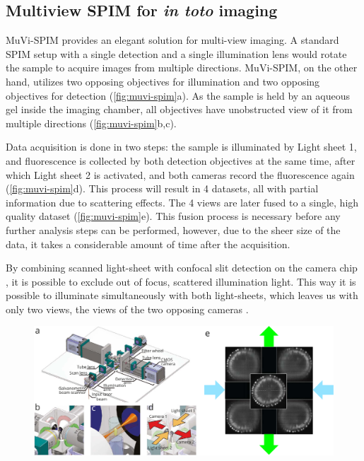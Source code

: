 \subsection{Multiview SPIM for \textit{in toto} imaging}

MuVi-SPIM  provides an elegant solution for multi-view imaging. A standard SPIM setup with a single detection and a single illumination lens would rotate the sample to acquire images from multiple directions. MuVi-SPIM, on the other hand, utilizes two opposing objectives for illumination and two opposing objectives for detection (\autoref{fig:muvi-spim}a). As the sample is held by an aqueous gel inside the imaging chamber, all objectives have unobstructed view of it from multiple directions (\autoref{fig:muvi-spim}b,c).

Data acquisition is done in two steps: the sample is illuminated by Light sheet 1, and fluorescence is collected by both detection objectives at the same time, after which Light sheet 2 is activated, and both cameras record the fluorescence again (\autoref{fig:muvi-spim}d). This process will result in 4 datasets, all with partial information due to scattering effects. The 4 views are later fused to a single, high quality dataset (\autoref{fig:muvi-spim}e). This fusion process is necessary before any further analysis steps can be performed, however, due to the sheer size of the data, it takes a considerable amount of time after the acquisition.

By combining scanned light-sheet \cite{keller_reconstruction_2008} with confocal slit detection on the camera chip \cite{baumgart_scanned_2012}, it is possible to exclude out of focus, scattered illumination light. This way it is  possible to illuminate simultaneously with both light-sheets, which leaves us with only two views, the views of the two opposing cameras \cite{de_medeiros_confocal_2015}.

\begin{figure}
  \centering
  \includegraphics[width=1\columnwidth]{fusion/muvi-spim}
  \label{fig:muvi-spim}
\end{figure}




